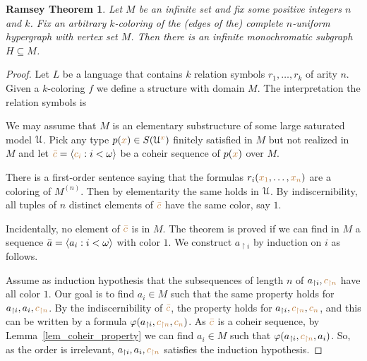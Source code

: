 \theoremstyle{mio}
\newtheorem{Ramsey}[thm]{Ramsey Theorem}
\begin{Ramsey}\label{thm_Ramsey}
Let $M$ be an infinite set and fix some positive integers $n$ and $k$.
Fix an arbitrary $k$-coloring of the (edges of the) complete $n$-uniform hypergraph with vertex set $M$.
Then there is an infinite monochromatic subgraph $H\subseteq M$.
\end{Ramsey}
\begin{proof}
Let $L$ be a language that contains $k$ relation symbols $r_1,\dots,r_k$ of arity $n$.
Given a $k$-coloring $f$ we define a structure with domain $M$.
The interpretation the relation symbols is




We may assume that $M$ is an elementary substructure of some large saturated model $\EuScript U$.
Pick any type $p({\color{brown} x})\in S(\EuScript U^{\color{brown} x})$ finitely satisfied in $M$ but not realized in $M$ and let ${\color{brown}\bar c}=\langle{\color{brown}c_i}:i<\omega\rangle$ be a coheir sequence of $p({\color{brown} x})$ over $M$.

There is a first-order sentence saying that the formulas $r_i({\color{brown} x_1},\dots,{\color{brown} x_n})$ are a coloring of $M^{(n)}$.
Then by elementarity the same holds in $\EuScript U$.
By indiscernibility,
all tuples of $n$ distinct elements of ${\color{brown}\bar c}$ have the same color, say $1$.


Incidentally, no element of ${\color{brown}\bar c}$ is in $M$.
The theorem is proved if we can find in $M$ a sequence $\bar a=\langle a_i:i<\omega\rangle$ with color $1$.
We construct $a_{\restriction i}$ by induction on $i$ as follows.

Assume as induction hypothesis that the subsequences of length $n$ of $a_{\restriction i},{\color{brown} c_{\restriction n}}$ have all color $1$.
Our goal is to find $a_i\in M$ such that the same property holds for $a_{\restriction i},a_i,{\color{brown} c_{\restriction n}}$.
By the indiscernibility of ${\color{brown}\bar c}$,
the property holds for  $a_{\restriction i},{\color{brown} c_{\restriction n}},{\color{brown}{c_n}}$, and this can be written by a formula $\varphi(a_{\restriction i},{\color{brown} c_{\restriction n}},{\color{brown}{c_n}})$.
As ${\color{brown}\bar c}$ is a coheir sequence,
by Lemma~\ref{lem_coheir_property} we can find  $a_i\in M$ such that  $\varphi(a_{\restriction i},{\color{brown} c_{\restriction n}},a_i)$.
So,
as the order is irrelevant,
$a_{\restriction i},a_i,{\color{brown} c_{\restriction n}}$ satisfies the induction hypothesis.
\end{proof}

